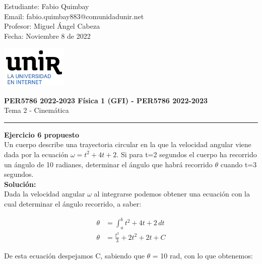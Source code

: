\documentclass[11pt,letterpaper]{article}
\begin{document}
\pagestyle{plain}

\begin{flushleft}
Estudiante: Fabio Quimbay\\
Email: fabio.quimbay883@comunidadunir.net\\
Profesor: Miguel Ángel Cabeza\\
Fecha: Noviembre 8 de 2022\\
\end{flushleft}

\begin{flushright}\vspace{-20mm}
\includegraphics[height=2cm]{logo.png}
\end{flushright}
 
\begin{center}\vspace{0cm}
\textbf{\large PER5786 2022-2023  Física 1 (GFI) - PER5786 2022-2023}\\
 Tema 2 - Cinemática
\end{center}

 
\rule{\linewidth}{0.1mm}

\bigskip
\bigskip

\textbf{Ejercicio 6 propuesto}\\

Un cuerpo describe una trayectoria circular en la que la velocidad angular viene dada por la ecuación $\omega = t^2 + 4t +2$. Si para t=2 segundos el cuerpo ha recorrido un ángulo de 10 radianes, determinar el ángulo que habrá recorrido $\theta$ cuando t=3 segundos.\\

\textbf{Solución:}\\

Dada la velocidad angular $\omega$ al integrarse podemos obtener una ecuación con la cual determinar el ángulo recorrido, a saber:

\begin{align}
\theta &= \int_{a}^{b} t^2 + 4t +2\,dt\\
\theta &= \frac{t^3}{3} + 2t^2 + 2t + C
\end{align}

De esta ecuación despejamos C, sabiendo que $\theta$ = 10 rad, con lo que obtenemos:
\end{document}
